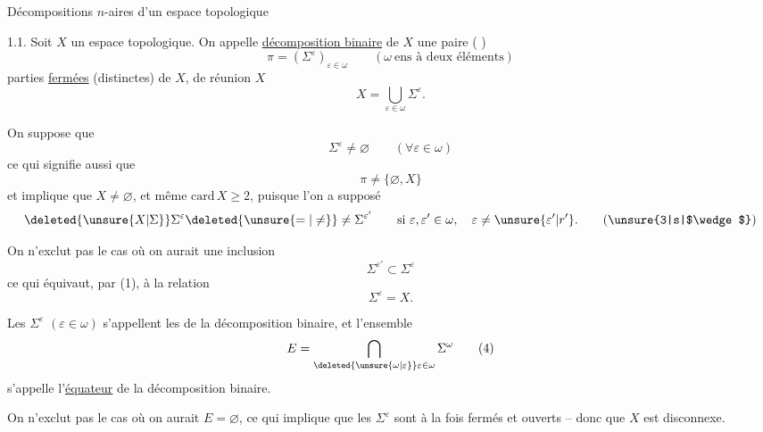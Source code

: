 \begingroup
\makeatletter\tagsleft@true\makeatother
\noindent Décompositions $n$-aires d'un espace topologique

1.1. Soit $X$ un espace topologique. On appelle \uline{décomposition binaire} de $X$ une paire ( )
\[
\pi=(\Sigma^\varepsilon)_{\varepsilon\in\omega}\qquad(\omega\ \text{ens à deux éléments})
\]
  parties \uline{fermées} (distinctes) de $X$, de réunion $X$
\[
X=\bigcup_{\varepsilon\in\omega}\Sigma^\varepsilon.\tag*{(1)}
\]

On suppose que
\[
\Sigma^\varepsilon\ne\varnothing\qquad(\forall\varepsilon\in\omega)\tag*{(2)}
\]
ce qui signifie aussi que
\[
\pi\ne\{\varnothing,X\}\tag*{$(2')$}
\]
et implique que $X\ne\varnothing$, et même $\mathrm{card}\,X\geq 2$, puisque l'on a supposé
\[
\deleted{\unsure{X|\Sigma}}\Sigma^\varepsilon\deleted{\unsure{=|\ne}}\ne\Sigma^{\varepsilon'}\qquad\text{si }\varepsilon,\varepsilon'\in\omega,\quad\varepsilon\ne\unsure{\varepsilon'|r'}.\tag*{(\unsure{3|s|$\wedge$})}
\]

On n'exclut pas le cas où on aurait une inclusion
\[
\Sigma^{\varepsilon'}\subset\Sigma^\varepsilon
\]
ce qui équivaut, par (1), à la relation
\[
\Sigma^\varepsilon=X.
\]

Les $\Sigma^\varepsilon$ $(\varepsilon\in\omega)$ s'appellent les \uline{} de la décomposition binaire,  et l'ensemble
\[
E=\bigcap_{\deleted{\unsure{\omega|\varepsilon}}\varepsilon\in\omega}\Sigma^\omega\tag*{(4)}
\]
s'appelle l'\uline{équateur} de la décomposition binaire.

On n'exclut pas le cas où on aurait $E=\varnothing$, ce qui implique que les $\Sigma^\varepsilon$ \inserted{$(\varepsilon\in\omega)$} sont  à la fois fermés et ouverts -- donc que $X$ est disconnexe.
\endgroup
